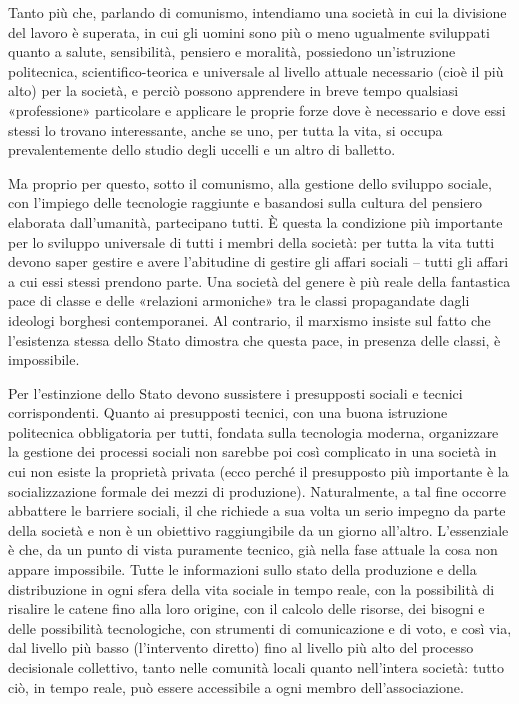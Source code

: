 \documentclass[../main]{subfiles}
\begin{document}
Tanto più che, parlando di comunismo, intendiamo una società in cui la divisione del lavoro è superata, in cui gli uomini sono più o meno ugualmente sviluppati quanto a salute, sensibilità, pensiero e moralità, possiedono un'istruzione politecnica, scientifico-teorica e universale al livello attuale necessario (cioè il più alto) per la società, e perciò possono apprendere in breve tempo qualsiasi «professione» particolare e applicare le proprie forze dove è necessario e dove essi stessi lo trovano interessante, anche se uno, per tutta la vita, si occupa prevalentemente dello studio degli uccelli e un altro di balletto.

Ma proprio per questo, sotto il comunismo, alla gestione dello sviluppo sociale, con l'impiego delle tecnologie raggiunte e basandosi sulla cultura del pensiero elaborata dall'umanità, partecipano tutti. È questa la condizione più importante per lo sviluppo universale di tutti i membri della società: per tutta la vita tutti devono saper gestire e avere l'abitudine di gestire gli affari sociali – tutti gli affari a cui essi stessi prendono parte. Una società del genere è più reale della fantastica pace di classe e delle «relazioni armoniche» tra le classi propagandate dagli ideologi borghesi contemporanei. Al contrario, il marxismo insiste sul fatto che l'esistenza stessa dello Stato dimostra che questa pace, in presenza delle classi, è impossibile.

Per l'estinzione dello Stato devono sussistere i presupposti sociali e tecnici corrispondenti. Quanto ai presupposti tecnici, con una buona istruzione politecnica obbligatoria per tutti, fondata sulla tecnologia moderna, organizzare la gestione dei processi sociali non sarebbe poi così complicato in una società in cui non esiste la proprietà privata (ecco perché il presupposto più importante è la socializzazione formale dei mezzi di produzione). Naturalmente, a tal fine occorre abbattere le barriere sociali, il che richiede a sua volta un serio impegno da parte della società e non è un obiettivo raggiungibile da un giorno all'altro. L'essenziale è che, da un punto di vista puramente tecnico, già nella fase attuale la cosa non appare impossibile. Tutte le informazioni sullo stato della produzione e della distribuzione in ogni sfera della vita sociale in tempo reale, con la possibilità di risalire le catene fino alla loro origine, con il calcolo delle risorse, dei bisogni e delle possibilità tecnologiche, con strumenti di comunicazione e di voto, e così via, dal livello più basso (l'intervento diretto) fino al livello più alto del processo decisionale collettivo, tanto nelle comunità locali quanto nell'intera società: tutto ciò, in tempo reale, può essere accessibile a ogni membro dell'associazione.
\end{document}

